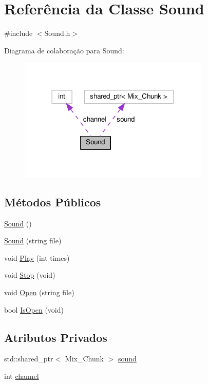 \hypertarget{classSound}{\section{Referência da Classe Sound}
\label{classSound}
}


{\ttfamily \#include $<$Sound.\+h$>$}



Diagrama de colaboração para Sound\+:\nopagebreak
\begin{figure}[H]
\begin{center}
\leavevmode
\includegraphics[width=258pt]{classSound__coll__graph}
\end{center}
\end{figure}
\subsection*{Métodos Públicos}
\begin{DoxyCompactItemize}
\item 
\hyperlink{classSound_a539c205cdf06fe2c621fd77c37bcfac9}{Sound} ()
\item 
\hyperlink{classSound_af2c277cdc12b7df1de53e5b855e4f09c}{Sound} (string file)
\item 
void \hyperlink{classSound_a2719199f31d8abfc0bd9a6814e4e169d}{Play} (int times)
\item 
void \hyperlink{classSound_ae391c15fe26a0091e601be32eef0bce5}{Stop} (void)
\item 
void \hyperlink{classSound_afa261d68708b917bf60d704238b56f87}{Open} (string file)
\item 
bool \hyperlink{classSound_a9e67e48d34d9ca3d31f0da846ada923b}{Is\+Open} (void)
\end{DoxyCompactItemize}
\subsection*{Atributos Privados}
\begin{DoxyCompactItemize}
\item 
std\+::shared\+\_\+ptr$<$ Mix\+\_\+\+Chunk $>$ \hyperlink{classSound_a44bbda770ac76c7455b60d3d63b663a7}{sound}
\item 
int \hyperlink{classSound_af3895edf5a39772f1de32cfbfff90909}{channel}
\end{DoxyCompactItemize}


